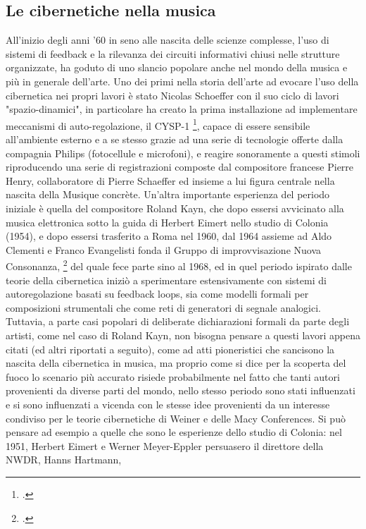\subsection{Le cibernetiche nella musica}
\label{sec:Le cibernetiche nella musica}
All'inizio degli anni '60 in seno alle nascita delle scienze complesse,
l'uso di sistemi di feedback e la rilevanza dei circuiti informativi chiusi
nelle strutture organizzate,
ha goduto di uno slancio popolare anche nel mondo della musica
e più in generale dell'arte.
Uno dei primi nella storia dell'arte ad evocare l'uso della cibernetica
nei propri lavori è stato
Nicolas Schoeffer con il suo ciclo di lavori "spazio-dinamici",
in particolare ha creato la prima installazione ad implementare meccanismi
di auto-regolazione, il CYSP-1 \footcite{SanfilippoValle},
capace di essere sensibile all'ambiente esterno e a se stesso
grazie ad una serie di tecnologie offerte dalla compagnia Philips (fotocellule e microfoni),
e reagire sonoramente a questi stimoli riproducendo
una serie di registrazioni composte dal compositore francese Pierre Henry,
collaboratore di Pierre Schaeffer ed insieme a lui figura centrale nella nascita della Musique concrète.
Un'altra importante esperienza del periodo iniziale è quella del compositore Roland Kayn,
che dopo essersi avvicinato alla musica elettronica sotto la guida di Herbert Eimert
nello studio di Colonia (1954),
e dopo essersi trasferito a Roma nel 1960, dal 1964 assieme ad Aldo Clementi e Franco Evangelisti
fonda il Gruppo di improvvisazione Nuova Consonanza, \footcite{Kaynbio}
del quale fece parte sino al 1968,
ed in quel periodo ispirato dalle teorie della cibernetica iniziò a sperimentare
estensivamente con sistemi di autoregolazione basati su feedback loops,
sia come modelli formali per composizioni strumentali che come reti di generatori di segnale analogici.
Tuttavia, a parte casi popolari di deliberate dichiarazioni
formali da parte degli artisti,
come nel caso di Roland Kayn,
non bisogna pensare a questi lavori appena citati (ed altri riportati a seguito),
come ad atti pioneristici che sancisono la nascita della cibernetica in musica,
ma proprio come si dice per la scoperta del fuoco
lo scenario più accurato risiede probabilmente nel fatto che
tanti autori provenienti da diverse parti del mondo, nello stesso periodo
sono stati influenzati e si sono influenzati a vicenda con le stesse idee
provenienti da un interesse condiviso per le teorie cibernetiche di Weiner e delle Macy Conferences.
Si può pensare ad esempio a quelle che sono le esperienze dello studio di Colonia:
nel 1951, Herbert Eimert e Werner Meyer-Eppler persuasero il direttore della NWDR, Hanns Hartmann,
